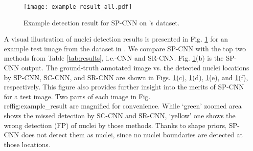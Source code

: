 \documentclass{article}
\begin{document}
\begin{table}[b!]
	\centering
	\caption{\ninept Nucleus detection results for dataset \cite{SC_CNN}}\vspace{-1pt}
	\label{tab:results}
	\end{table}
	
	
	\begin{figure}[ht!]
		\centering
		\texttt{[image: example\_result\_all.pdf]}\vspace{-3mm}
		\caption{\ninept Example detection result for SP-CNN on \cite{SC_CNN}'s dataset.}
		\label{fig:example_result}\vspace{-5mm}
	\end{figure}
	
		
A visual illustration of nuclei detection results is presented in Fig. \ref{fig:example_result} for an example test image from the dataset in \cite{SC_CNN}. We compare SP-CNN with the top two methods from Table \ref{tab:results}, i.e.\SC-CNN \cite{SC_CNN} and SR-CNN\cite{Xie2015}. Fig. \ref{fig:example_result}(b) is the SP-CNN output. The ground-truth annotated image vs. the detected nuclei locations by SP-CNN, SC-CNN, and SR-CNN are shown in Figs. \ref{fig:example_result}(c), \ref{fig:example_result}(d), \ref{fig:example_result}(e), and \ref{fig:example_result}(f), respectively. This figure also provides further insight into the merits of SP-CNN for a test image. Two parts of each image in Fig.\\ref{fig:example_result} are magnified for convenience. While `green' zoomed area shows the missed detection by SC-CNN and SR-CNN, `yellow' one shows the wrong detection (FP) of nuclei by those methods. Thanks to shape priors, SP-CNN does not detect them as nuclei, since no nuclei boundaries are detected at those locations. 
\end{document}
